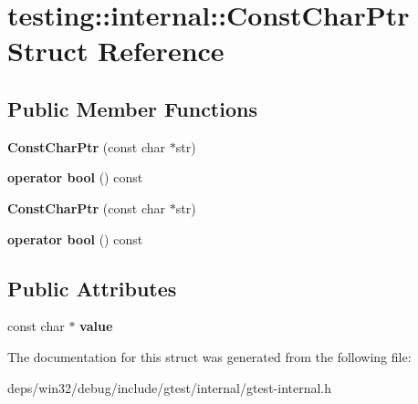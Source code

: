\hypertarget{structtesting_1_1internal_1_1_const_char_ptr}{}\section{testing\+:\+:internal\+:\+:Const\+Char\+Ptr Struct Reference}
\label{structtesting_1_1internal_1_1_const_char_ptr}
\subsection*{Public Member Functions}
\begin{DoxyCompactItemize}
\item 
\hypertarget{structtesting_1_1internal_1_1_const_char_ptr_ae94f6453fa679d815994eccc63062907}{}{\bfseries Const\+Char\+Ptr} (const char $\ast$str)\label{structtesting_1_1internal_1_1_const_char_ptr_ae94f6453fa679d815994eccc63062907}

\item 
\hypertarget{structtesting_1_1internal_1_1_const_char_ptr_a891bc286350b81d1a147101c0bae5b1d}{}{\bfseries operator bool} () const \label{structtesting_1_1internal_1_1_const_char_ptr_a891bc286350b81d1a147101c0bae5b1d}

\item 
\hypertarget{structtesting_1_1internal_1_1_const_char_ptr_ae94f6453fa679d815994eccc63062907}{}{\bfseries Const\+Char\+Ptr} (const char $\ast$str)\label{structtesting_1_1internal_1_1_const_char_ptr_ae94f6453fa679d815994eccc63062907}

\item 
\hypertarget{structtesting_1_1internal_1_1_const_char_ptr_a891bc286350b81d1a147101c0bae5b1d}{}{\bfseries operator bool} () const \label{structtesting_1_1internal_1_1_const_char_ptr_a891bc286350b81d1a147101c0bae5b1d}

\end{DoxyCompactItemize}
\subsection*{Public Attributes}
\begin{DoxyCompactItemize}
\item 
\hypertarget{structtesting_1_1internal_1_1_const_char_ptr_a39e195c4214c28f7b1a7dd711742c56e}{}const char $\ast$ {\bfseries value}\label{structtesting_1_1internal_1_1_const_char_ptr_a39e195c4214c28f7b1a7dd711742c56e}

\end{DoxyCompactItemize}


The documentation for this struct was generated from the following file\+:\begin{DoxyCompactItemize}
\item 
deps/win32/debug/include/gtest/internal/gtest-\/internal.\+h\end{DoxyCompactItemize}
